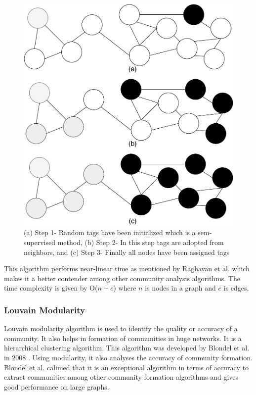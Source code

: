 \documentclass[journal,twoside,web]{ieeecolor}
\begin{document}
\begin{figure}[!h]
    \centerline{\includegraphics[scale=0.35]{figures/label_propagation.pdf}}
    \caption{(a) Step 1- Random tags have been initialized which is a sem-supervised method, (b) Step 2- In this step tags are adopted from neighbors, and (c) Step 3- Finally all nodes have been assigned tags}
    \label{fig6}
\end{figure}

This algorithm performs near-linear time as mentioned by Raghavan et al.\cite{16} which makes it a better contender among other community analysis algorithms. The time complexity is given by O($n + e$) where $n$ is nodes in a graph and $e$ is edges.

\subsubsection{Louvain Modularity}
Louvain modularity algorithm is used to identify the quality or accuracy of a community. It also helps in formation of communities in huge networks. It is a hierarchical clustering algorithm. This algorithm was developed by Blondel et al. in 2008 \cite{20}. Using modularity, it also analyses the accuracy of community formation. Blondel et al. calimed that it is an exceptional algorithm in terms of accuracy to extract communities among other community formation algorithms and gives good performance on large graphs.
\end{document}

